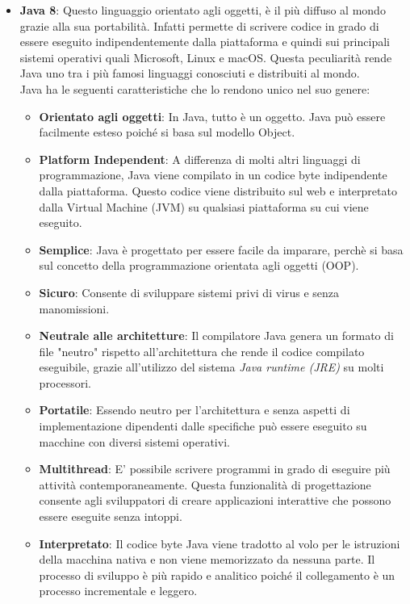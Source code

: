 \begin{itemize}
\item \textbf{Java 8}: Questo linguaggio orientato agli oggetti, è il più diffuso al mondo grazie alla sua portabilità. Infatti permette di scrivere codice in grado di essere eseguito indipendentemente dalla piattaforma e quindi sui principali sistemi operativi quali Microsoft, Linux e macOS. Questa peculiarità rende Java uno tra i più famosi linguaggi conosciuti e distribuiti al mondo.
\\Java ha le seguenti caratteristiche che lo rendono unico nel suo genere:
\begin{itemize}
\item \textbf{Orientato agli oggetti}: In Java, tutto è un oggetto. Java può essere facilmente esteso poiché si basa sul modello Object.
\item \textbf{Platform Independent}: A differenza di molti altri linguaggi di programmazione, Java viene compilato in un codice byte indipendente dalla piattaforma. Questo codice viene distribuito sul web e interpretato dalla Virtual Machine (JVM) su qualsiasi piattaforma su cui viene eseguito.
\item \textbf{Semplice}: Java è progettato per essere facile da imparare, perchè si basa sul concetto della programmazione orientata agli oggetti (OOP).
\item \textbf{Sicuro}: Consente di sviluppare sistemi privi di virus e senza manomissioni.
\item \textbf{Neutrale alle architetture}: Il compilatore Java genera un formato di file "neutro" rispetto all'architettura che rende il codice compilato eseguibile,  grazie all'utilizzo del sistema \textit{Java runtime (JRE)} su molti processori.
\item \textbf{Portatile}: Essendo neutro per l'architettura e senza aspetti di implementazione dipendenti dalle specifiche può essere eseguito su macchine con diversi sistemi operativi.
\item \textbf{Multithread}: E' possibile scrivere programmi in grado di eseguire più attività contemporaneamente. Questa funzionalità di progettazione consente agli sviluppatori di creare applicazioni interattive che possono essere eseguite senza intoppi.
\item \textbf{Interpretato}: Il codice byte Java viene tradotto al volo per le istruzioni della macchina nativa e non viene memorizzato da nessuna parte. Il processo di sviluppo è più rapido e analitico poiché il collegamento è un processo incrementale e leggero.

\end{itemize}
\end{itemize}
